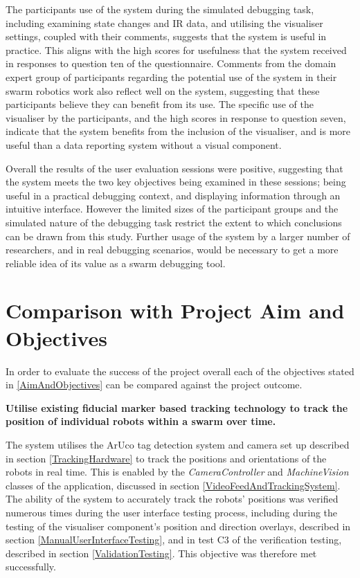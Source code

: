 The participants use of the system during the simulated debugging task, including examining state changes and IR data, and utilising the visualiser settings, coupled with their comments, suggests that the system is useful in practice. This aligns with the high scores for usefulness that the system received in responses to question ten of the questionnaire. Comments from the domain expert group of participants regarding the potential use of the system in their swarm robotics work also reflect well on the system, suggesting that these participants believe they can benefit from its use. The specific use of the visualiser by the participants, and the high scores in response to question seven, indicate that the system benefits from the inclusion of the visualiser, and is more useful than a data reporting system without a visual component.

Overall the results of the user evaluation sessions were positive, suggesting that the system meets the two key objectives being examined in these sessions; being useful in a practical debugging context, and displaying information through an intuitive interface. However the limited sizes of the participant groups and the simulated nature of the debugging task restrict the extent to which conclusions can be drawn from this study. Further usage of the system by a larger number of researchers, and in real debugging scenarios, would be necessary to get a more reliable idea of its value as a swarm debugging tool.


\section{Comparison with Project Aim and Objectives}

In order to evaluate the success of the project overall each of the objectives stated in \ref{AimAndObjectives} can be compared against the project outcome.

\noindent \textbf{Utilise existing fiducial marker based tracking technology to track the position of individual robots within a swarm over time.}

The system utilises the ArUco tag detection system and camera set up described in section \ref{TrackingHardware} to track the positions and orientations of the robots in real time. This is enabled by the \textit{CameraController} and \textit{MachineVision} classes of the application, discussed in section \ref{VideoFeedAndTrackingSystem}. The ability of the system to accurately track the robots' positions was verified numerous times during the user interface testing process, including during the testing of the visualiser component's position and direction overlays, described in section \ref{ManualUserInterfaceTesting}, and in test C3 of the verification testing, described in section \ref{ValidationTesting}. This objective was therefore met successfully.

